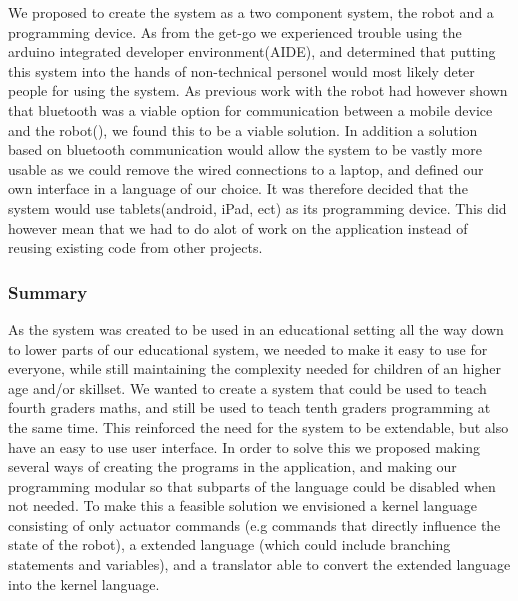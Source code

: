 
\bigskip\noindent
We proposed to create the system as a two component system, the \chirp robot and a programming device. 
As from the get-go we experienced trouble using the arduino integrated developer environment(AIDE), and determined that putting this system into the hands of non-technical personel would most likely deter people for using the system. 
As previous work with the robot had however shown that bluetooth was a viable option for communication between a mobile device and the robot(\cite{chrip2013ResearcherNight}), we found this to be a viable solution.
In addition a solution based on bluetooth communication would allow the system to be vastly more usable as we could remove the wired connections to a laptop, and defined our own interface in a language of our choice.
It was therefore decided that the system would use tablets(android, iPad, ect) as its programming device. This did however mean that we had to do alot of work on the application instead of reusing existing code from other projects. 

\subsubsection{Summary}
As the system was created to be used in an educational setting all the way down to lower parts of our educational system, 
we needed to make it easy to use for everyone, while still maintaining the complexity needed for children of an higher age and/or skillset. 
We wanted to create a system that could be used to teach fourth graders maths, and still be used to teach tenth graders programming at the same time. This reinforced the need for the system to be extendable, but also have an easy to use user interface. 
In order to solve this we proposed making several ways of creating the programs in the application, and making our programming modular so that subparts of the language could be disabled when not needed. To make this a feasible solution we envisioned a kernel language consisting of only actuator commands (e.g commands that directly influence the state of the robot), a extended language (which could include branching statements and variables), and a translator able to convert the extended language into the kernel language.
	
